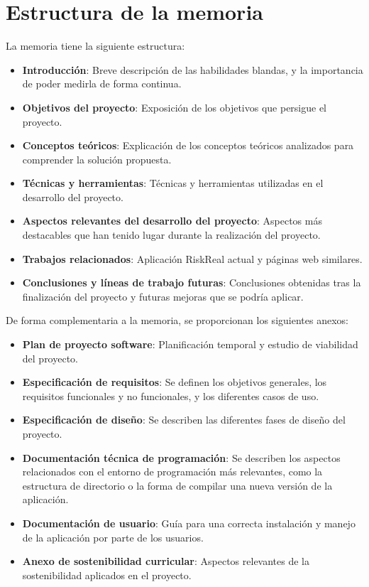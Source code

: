 \section{Estructura de la memoria}

La memoria tiene la siguiente estructura:

\begin{itemize}
	\item \textbf{Introducción}: Breve descripción de las habilidades blandas, y la importancia de poder medirla de forma continua.
	\item \textbf{Objetivos del proyecto}: Exposición de los objetivos que persigue el proyecto.
	\item \textbf{Conceptos teóricos}: Explicación de los conceptos teóricos analizados para comprender la solución propuesta.
	\item \textbf{Técnicas y herramientas}: Técnicas y herramientas utilizadas en el desarrollo del proyecto.
	\item \textbf{Aspectos relevantes del desarrollo del proyecto}: Aspectos más destacables que han tenido lugar durante la realización del proyecto.
	\item \textbf{Trabajos relacionados}: Aplicación RiskReal\cite{web:riskreal} actual y páginas web similares.
	\item \textbf{Conclusiones y líneas de trabajo futuras}: Conclusiones obtenidas tras la finalización del proyecto y futuras mejoras que se podría aplicar.
\end{itemize}

De forma complementaria a la memoria, se proporcionan los siguientes anexos:

\begin{itemize}
	\item \textbf{Plan de proyecto software}: Planificación temporal y estudio de viabilidad del proyecto.
	\item \textbf{Especificación de requisitos}: Se definen los objetivos generales, los requisitos funcionales y no funcionales, y los diferentes casos de uso. 
	\item \textbf{Especificación de diseño}: Se describen las diferentes fases de diseño del proyecto.
	\item \textbf{Documentación técnica de programación}: Se describen los aspectos relacionados con el entorno de programación más relevantes, como la estructura de directorio o la forma de compilar una nueva versión de la aplicación.
	\item \textbf{Documentación de usuario}: Guía para una correcta instalación y manejo de la aplicación por parte de los usuarios.
	\item \textbf{Anexo de sostenibilidad curricular}: Aspectos relevantes de la sostenibilidad aplicados en el proyecto.
\end{itemize}

